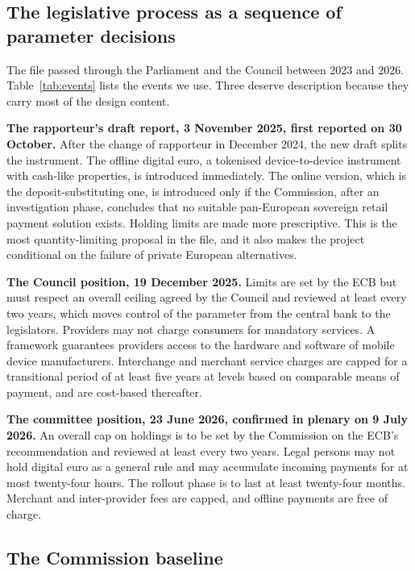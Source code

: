 \documentclass[11pt]{article}
\theoremstyle{plain}\newtheorem{proposition}{Proposition}
\begin{document}
\subsection{The legislative process as a sequence of parameter decisions}

The file passed through the Parliament and the Council between 2023 and 2026. Table~\ref{tab:events} lists the events we use. Three deserve description because they carry most of the design content.

\textbf{The rapporteur's draft report, 3 November 2025, first reported on 30 October.} After the change of rapporteur in December 2024, the new draft splits the instrument. The offline digital euro, a tokenised device-to-device instrument with cash-like properties, is introduced immediately. The online version, which is the deposit-substituting one, is introduced only if the Commission, after an investigation phase, concludes that no suitable pan-European sovereign retail payment solution exists. Holding limits are made more prescriptive. This is the most quantity-limiting proposal in the file, and it also makes the project conditional on the failure of private European alternatives.

\textbf{The Council position, 19 December 2025.} Limits are set by the ECB but must respect an overall ceiling agreed by the Council and reviewed at least every two years, which moves control of the parameter from the central bank to the legislators. Providers may not charge consumers for mandatory services. A framework guarantees providers access to the hardware and software of mobile device manufacturers. Interchange and merchant service charges are capped for a transitional period of at least five years at levels based on comparable means of payment, and are cost-based thereafter.

\textbf{The committee position, 23 June 2026, confirmed in plenary on 9 July 2026.} An overall cap on holdings is to be set by the Commission on the ECB's recommendation and reviewed at least every two years. Legal persons may not hold digital euro as a general rule and may accumulate incoming payments for at most twenty-four hours. The rollout phase is to last at least twenty-four months. Merchant and inter-provider fees are capped, and offline payments are free of charge.

\subsection{The Commission baseline}
\end{document}
